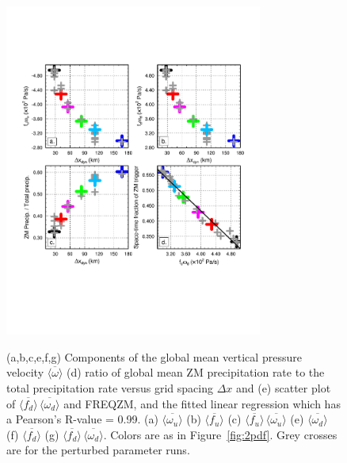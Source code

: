 \begin{figure}[t]
\begin{center}
\noindent\includegraphics[width=20pc,angle=0]{figs/temp_diags_4panel.pdf}\\
\end{center}
\caption{(a,b,c,e,f,g) Components of the global mean vertical pressure velocity $\overline{\langle \omega \rangle}$ (d) ratio of global mean ZM precipitation rate to the total precipitation rate versus grid spacing $\Delta x$ and (e) scatter plot of $\overline{\langle f_{d} \rangle} \, \overline{\langle \omega_{d} \rangle}$ and FREQZM, and the fitted linear regression which has a Pearson's R-value = 0.99. (a) $\overline{\langle \omega_{u} \rangle}$ (b) $\overline{\langle f_{u} \rangle}$ (c) $\overline{\langle f_{u} \rangle} \, \overline{\langle \omega_{u} \rangle}$ (e) $\overline{\langle \omega_{d} \rangle}$ (f) $ \overline{\langle f_{d} \rangle}$ (g) $\overline{\langle f_{d} \rangle} \, \overline{\langle \omega_{d} \rangle}$. Colors are as in Figure~\ref{fig:2pdf}. Grey crosses are for the perturbed parameter runs.}
\label{fig:8panel}
\end{figure}

